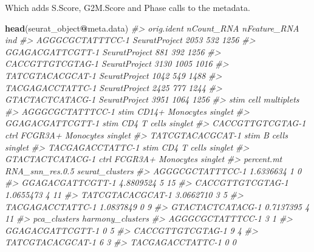 \documentclass[
]{book}
\newenvironment{Shaded}{\begin{snugshade}}{\end{snugshade}}
\newcommand{\CommentTok}[1]{\textcolor[rgb]{0.56,0.35,0.01}{\textit{#1}}}
\newcommand{\FunctionTok}[1]{\textcolor[rgb]{0.13,0.29,0.53}{\textbf{#1}}}
\newcommand{\NormalTok}[1]{#1}
\newcommand{\SpecialCharTok}[1]{\textcolor[rgb]{0.81,0.36,0.00}{\textbf{#1}}}
\begin{document}
Which adds S.Score, G2M.Score and Phase calls to the metadata.

\begin{Shaded}
\begin{Highlighting}[]
\FunctionTok{head}\NormalTok{(seurat\_object}\SpecialCharTok{@}\NormalTok{meta.data)}
\CommentTok{\#\textgreater{}                     orig.ident nCount\_RNA nFeature\_RNA  ind}
\CommentTok{\#\textgreater{} AGGGCGCTATTTCC{-}1 SeuratProject       2053          532 1256}
\CommentTok{\#\textgreater{} GGAGACGATTCGTT{-}1 SeuratProject        881          392 1256}
\CommentTok{\#\textgreater{} CACCGTTGTCGTAG{-}1 SeuratProject       3130         1005 1016}
\CommentTok{\#\textgreater{} TATCGTACACGCAT{-}1 SeuratProject       1042          549 1488}
\CommentTok{\#\textgreater{} TACGAGACCTATTC{-}1 SeuratProject       2425          777 1244}
\CommentTok{\#\textgreater{} GTACTACTCATACG{-}1 SeuratProject       3951         1064 1256}
\CommentTok{\#\textgreater{}                  stim              cell multiplets}
\CommentTok{\#\textgreater{} AGGGCGCTATTTCC{-}1 stim   CD14+ Monocytes    singlet}
\CommentTok{\#\textgreater{} GGAGACGATTCGTT{-}1 stim       CD4 T cells    singlet}
\CommentTok{\#\textgreater{} CACCGTTGTCGTAG{-}1 ctrl FCGR3A+ Monocytes    singlet}
\CommentTok{\#\textgreater{} TATCGTACACGCAT{-}1 stim           B cells    singlet}
\CommentTok{\#\textgreater{} TACGAGACCTATTC{-}1 stim       CD4 T cells    singlet}
\CommentTok{\#\textgreater{} GTACTACTCATACG{-}1 ctrl FCGR3A+ Monocytes    singlet}
\CommentTok{\#\textgreater{}                  percent.mt RNA\_snn\_res.0.5 seurat\_clusters}
\CommentTok{\#\textgreater{} AGGGCGCTATTTCC{-}1  1.6336634               1               0}
\CommentTok{\#\textgreater{} GGAGACGATTCGTT{-}1  4.8809524               5              15}
\CommentTok{\#\textgreater{} CACCGTTGTCGTAG{-}1  1.0655473               4              11}
\CommentTok{\#\textgreater{} TATCGTACACGCAT{-}1  3.0662710               3               5}
\CommentTok{\#\textgreater{} TACGAGACCTATTC{-}1  1.0837849               0               9}
\CommentTok{\#\textgreater{} GTACTACTCATACG{-}1  0.7137395               4              11}
\CommentTok{\#\textgreater{}                  pca\_clusters harmony\_clusters}
\CommentTok{\#\textgreater{} AGGGCGCTATTTCC{-}1            3                1}
\CommentTok{\#\textgreater{} GGAGACGATTCGTT{-}1            0                5}
\CommentTok{\#\textgreater{} CACCGTTGTCGTAG{-}1            9                4}
\CommentTok{\#\textgreater{} TATCGTACACGCAT{-}1            6                3}
\CommentTok{\#\textgreater{} TACGAGACCTATTC{-}1            0                0}

\end{Highlighting}
\end{Shaded}
\end{document}

